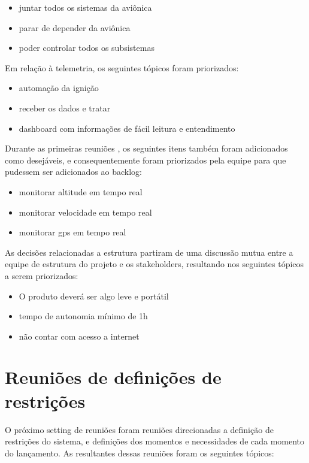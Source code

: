 \begin{apendicesenv}
    \begin{itemize}
        \item juntar todos os sistemas da aviônica
        \item parar de depender da aviônica
        \item poder controlar todos os subsistemas
    \end{itemize}
    
    Em relação à telemetria, os seguintes tópicos foram priorizados:
    
    \begin{itemize}
        \item automação da ignição
        \item receber os dados e tratar
        \item dashboard com informações de fácil leitura e entendimento
    \end{itemize}

Durante as primeiras reuniões , os seguintes itens também foram adicionados como desejáveis, e consequentemente foram priorizados pela equipe para que pudessem ser adicionados ao backlog:

\begin{itemize}
    \item monitorar altitude em tempo real
    \item monitorar velocidade em tempo real
    \item monitorar gps em tempo real
\end{itemize}

As decisões relacionadas a estrutura partiram de uma discussão mutua entre a equipe de estrutura do projeto e os stakeholders, resultando nos seguintes tópicos a serem priorizados:

\begin{itemize}
    \item O produto deverá ser algo leve e portátil
    \item tempo de autonomia mínimo de 1h
    \item não contar com acesso a internet
\end{itemize}

\section{Reuniões de definições de restrições}

O próximo setting de reuniões foram reuniões direcionadas a definição de restrições do sistema, e definições dos momentos e necessidades de cada momento do lançamento. As resultantes dessas reuniões foram os seguintes tópicos:


\end{apendicesenv}
